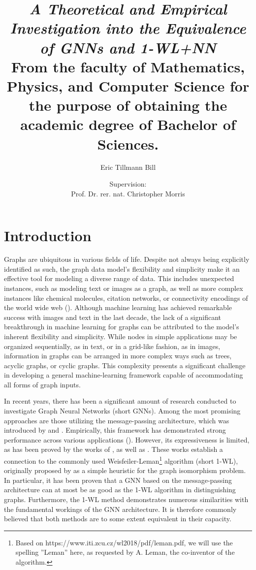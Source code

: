 \documentclass[11pt, dvipsnames, DIV=12]{scrreprt}
\title{\emph{A Theoretical and Empirical Investigation into the Equivalence of GNNs and 1-WL+NN}\\
\vspace{20pt}\small{\normalfont From the faculty of Mathematics, Physics, and Computer Science for the purpose of obtaining the academic degree of Bachelor of Sciences.}
}
\author{Eric Tillmann Bill}
\affil{\vspace{100pt}}
\author{Supervision:\\Prof. Dr. rer. nat. Christopher Morris}
\affil{Informatik 6\\RWTH Aachen University}
\date{\vspace{-30pt}}
\theoremstyle{definition}
\begin{document}
\maketitle
\tableofcontents
\newpage



\section{Introduction}
Graphs are ubiquitous in various fields of life. Despite not always being explicitly identified as such, the graph data model's flexibility and simplicity make it an effective tool for modeling a diverse range of data. This includes unexpected instances, such as modeling text or images as a graph, as well as more complex instances like chemical molecules, citation networks, or connectivity encodings of the world wide web (\cite{Mor+2020,Sca+2009}).
Although machine learning has achieved remarkable success with images and text in the last decade, the lack of a significant breakthrough in machine learning for graphs can be attributed to the model's inherent flexibility and simplicity. While nodes in simple applications may be organized sequentially, as in text, or in a grid-like fashion, as in images, information in graphs can be arranged in more complex ways such as trees, acyclic graphs, or cyclic graphs. This complexity presents a significant challenge in developing a general machine-learning framework capable of accommodating all forms of graph inputs.


In recent years, there has been a significant amount of research conducted to investigate Graph Neural Networks (short GNNs). Among the most promising approaches are those utilizing the message-passing architecture, which was introduced by \cite{Gil+2017} and \cite{Sca+2009}. Empirically, this framework has demonstrated strong performance across various applications (\cite{Kip+2017, Ham+2017, Xu2018}). However, its expressiveness is limited, as has been proved by the works of \cite{Morris2018}, as well as \cite{Xu2018}. These works establish a connection to the commonly used Weisfeiler-Leman\footnote{Based on https://www.iti.zcu.cz/wl2018/pdf/leman.pdf, we will use the spelling ''Leman'' here, as requested by A. Leman, the co-inventor of the algorithm.} algorithm (short 1-WL), originally proposed by \cite{Wei+1968} as a simple heuristic for the graph isomorphism problem. In particular, it has been proven that a GNN based on the message-passing architecture can at most be as good as the 1-WL algorithm in distinguishing graphs. Furthermore, the 1-WL method demonstrates numerous similarities with the fundamental workings of the GNN architecture. It is therefore commonly believed that both methods are to some extent equivalent in their capacity.
\end{document}
